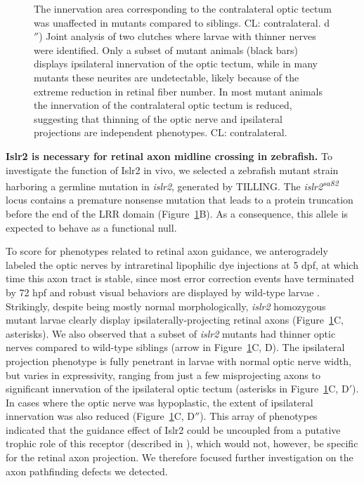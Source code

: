 \begin{figure}[hbtp]
\begin{center}
{		The innervation area corresponding to the contralateral optic tectum was unaffected in mutants compared to siblings.
		CL: contralateral.
		d$''$) Joint analysis of two clutches where larvae with thinner nerves were identified.
		Only a subset of mutant animals (black bars) displays ipsilateral innervation of the optic tectum, while in many mutants these neurites are undetectable, likely because of the extreme reduction in retinal fiber number.
		In most mutant animals the innervation of the contralateral optic tectum is reduced, suggesting that thinning of the optic nerve and ipsilateral projections are independent phenotypes.
		CL: contralateral.
		}
        \label{Linxfig1}
    \end{center}
\end{figure}

\noindent\textbf{Islr2 is necessary for retinal axon midline crossing in zebrafish.}\newline
\indent To investigate the function of Islr2 in vivo, we selected a zebrafish mutant strain harboring a germline mutation in \emph{islr2}, generated by TILLING.
The \emph{islr2\textsuperscript{sa82}} locus contains a premature nonsense mutation that leads to a protein truncation before the end of the LRR domain (Figure~\ref{Linxfig1}B).
As a consequence, this allele is expected to behave as a functional null.

To score for phenotypes related to retinal axon guidance, we anterogradely labeled the optic nerves by intraretinal lipophilic dye injections at 5 dpf, at which time this axon tract is stable, since most error correction events have terminated by 72 hpf \cite{hutson2002pathfinding} and robust visual behaviors are displayed by wild-type larvae \cite{easter1996development,neuhauss2003behavioral}.
Strikingly, despite being mostly normal morphologically, \emph{islr2} homozygous mutant larvae clearly display ipsilaterally-projecting retinal axons (Figure~\ref{Linxfig1}C, asterisks).
We also observed that a subset of \emph{islr2} mutants had thinner optic nerves compared to wild-type siblings (arrow in Figure~\ref{Linxfig1}C, D).
The ipsilateral projection phenotype is fully penetrant in larvae with normal optic nerve width, but varies in expressivity, ranging from just a few misprojecting axons to significant innervation of the ipsilateral optic tectum (asterisks in Figure~\ref{Linxfig1}C, D$'$).
In cases where the optic nerve was hypoplastic, the extent of ipsilateral innervation was also reduced (Figure~\ref{Linxfig1}C, D$''$).
This array of phenotypes indicated that the guidance effect of Islr2 could be uncoupled from a putative trophic role of this receptor (described in ), which would not, however, be specific for the retinal axon projection.
We therefore focused further investigation on the axon pathfinding defects we detected.

